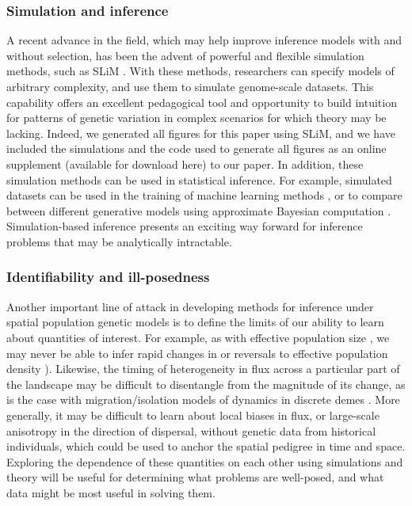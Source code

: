 \documentclass{ar-1col}
\begin{document}
\subsubsection{Simulation and inference} 
A recent advance in the field, 
which may help improve inference models with and without selection, 
has been the advent of powerful and flexible simulation methods, 
such as SLiM \citep{haller2018forward,haller2018treesequence,kelleher2018efficient}.
With these methods, 
researchers can specify models of arbitrary complexity, 
and use them to simulate genome-scale datasets.
This capability offers an excellent pedagogical tool 
and opportunity to build intuition for patterns of genetic variation 
in complex scenarios for which theory may be lacking.
Indeed, we generated all figures for this paper using SLiM, 
and we have included the simulations 
and the code used to generate all figures 
as an online supplement (available for download here) 
to our paper.
In addition, these simulation methods can be used in statistical inference.
For example, simulated datasets can be used in the training 
of machine learning methods \citep[e.g.,][]{flagel2018unreasonable}, 
or to compare between different generative models using 
approximate Bayesian computation \citep{MarjoramTavare2006modern}.
Simulation-based inference presents an exciting way forward 
for inference problems that may be analytically intractable.

\subsubsection{Identifiability and ill-posedness}

Another important line of attack in developing methods for inference 
under spatial population genetic models 
is to define the limits of our ability to learn about 
quantities of interest.
For example, 
as with effective population size \citep{Myers2008},
we may never be able to infer rapid changes in 
or reversals to effective population density
\citep[although see also][]{BhaskarSong2014descartes}).
Likewise, 
the timing of heterogeneity in flux across a particular part of the landscape 
may be difficult to disentangle from the magnitude of its change, 
as is the case with migration/isolation models 
of dynamics in discrete demes \citep{sousa2011nonidentifiability}.
More generally,
it may be difficult to learn about local biases in flux, 
or large-scale anisotropy in the direction of dispersal,
without genetic data from historical individuals, 
which could be used to anchor the spatial pedigree 
in time and space.
Exploring the dependence of these quantities on each other 
using simulations and theory 
will be useful for determining what problems are well-posed, 
and what data might be most useful in solving them.
\end{document}
